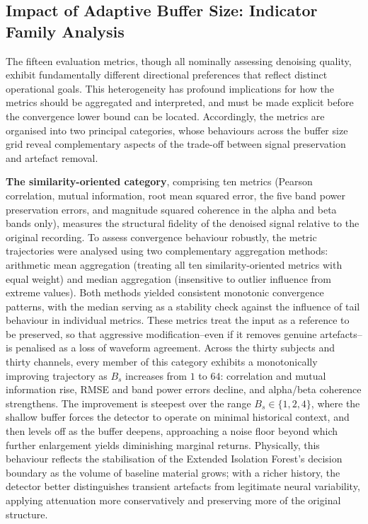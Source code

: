 \documentclass[MScCS,12pt,oneside,final]{uccthesis}
\begin{document}
    \subsection{Impact of Adaptive Buffer Size: Indicator Family Analysis}
\label{subsec:impact_bs}

The fifteen evaluation metrics, though all nominally assessing denoising quality, exhibit fundamentally different directional preferences that reflect distinct operational goals. This heterogeneity has profound implications for how the metrics should be aggregated and interpreted, and must be made explicit before the convergence lower bound can be located. Accordingly, the metrics are organised into two principal categories, whose behaviours across the buffer size grid reveal complementary aspects of the trade-off between signal preservation and artefact removal.

\textbf{The similarity-oriented category}, comprising ten metrics (Pearson correlation, mutual information, root mean squared error, the five band power preservation errors, and magnitude squared coherence in the alpha and beta bands only), measures the structural fidelity of the denoised signal relative to the original recording. To assess convergence behaviour robustly, the metric trajectories were analysed using two complementary aggregation methods: arithmetic mean aggregation (treating all ten similarity-oriented metrics with equal weight) and median aggregation (insensitive to outlier influence from extreme values). Both methods yielded consistent monotonic convergence patterns, with the median serving as a stability check against the influence of tail behaviour in individual metrics. These metrics treat the input as a reference to be preserved, so that aggressive modification--even if it removes genuine artefacts--is penalised as a loss of waveform agreement. Across the thirty subjects and thirty channels, every member of this category exhibits a monotonically improving trajectory as $B_s$ increases from $1$ to $64$: correlation and mutual information rise, RMSE and band power errors decline, and alpha/beta coherence strengthens. The improvement is steepest over the range $B_s \in \{1, 2, 4\}$, where the shallow buffer forces the detector to operate on minimal historical context, and then levels off as the buffer deepens, approaching a noise floor beyond which further enlargement yields diminishing marginal returns. Physically, this behaviour reflects the stabilisation of the Extended Isolation Forest's decision boundary as the volume of baseline material grows; with a richer history, the detector better distinguishes transient artefacts from legitimate neural variability, applying attenuation more conservatively and preserving more of the original structure.
\end{document}
